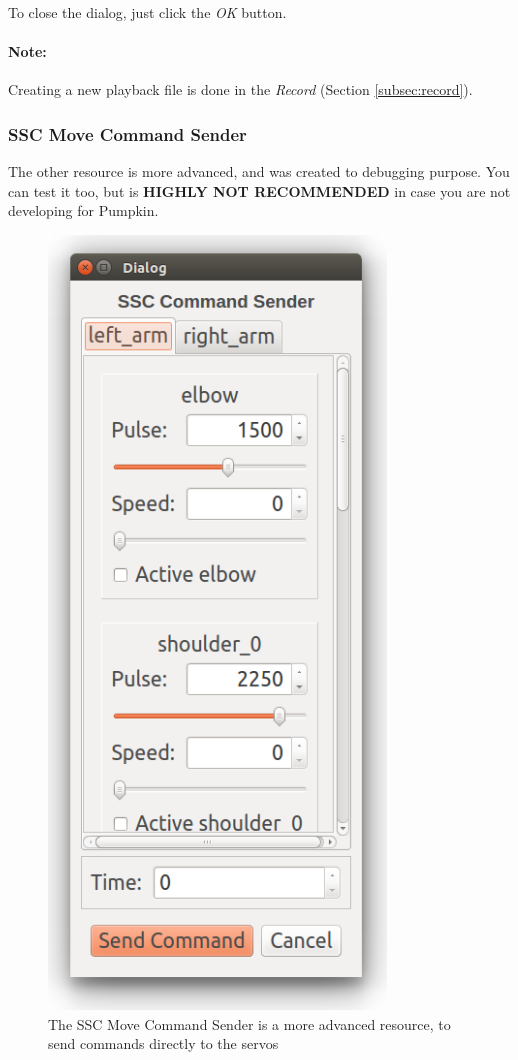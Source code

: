 \documentclass[oneside,a4paper,titlepage]{article}
\begin{document}
To close the dialog, just click the \emph{OK} button.

\paragraph{Note: } Creating a new playback file is done in the \emph{Record} (Section \ref{subsec:record}).

\subsubsection{SSC Move Command Sender}

The other resource is more advanced, and was created to debugging purpose. You can test it too, but is \textbf{\color{red} HIGHLY NOT RECOMMENDED} in case you are not developing for Pumpkin.

\begin{figure}[h]
	\centering
	\includegraphics[width=0.8\textwidth]{ssc}
	\caption[SSC Move Command Sender]{The SSC Move Command Sender is a more advanced resource, to send commands directly to the servos}
	\label{fig:ssc}
\end{figure}
\end{document}
